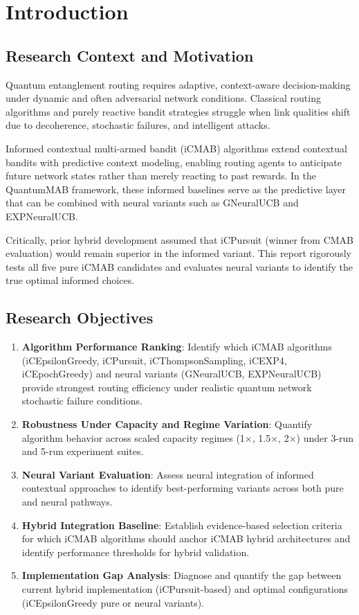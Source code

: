 \documentclass[12pt,a4paper]{article}
\begin{document}
\newpage
\section{Introduction}

\subsection{Research Context and Motivation}
Quantum entanglement routing requires adaptive, context-aware decision-making under dynamic and often adversarial network conditions. Classical routing algorithms and purely reactive bandit strategies struggle when link qualities shift due to decoherence, stochastic failures, and intelligent attacks.

Informed contextual multi-armed bandit (iCMAB) algorithms extend contextual bandits with predictive context modeling, enabling routing agents to anticipate future network states rather than merely reacting to past rewards. In the QuantumMAB framework, these informed baselines serve as the predictive layer that can be combined with neural variants such as GNeuralUCB and EXPNeuralUCB.

Critically, prior hybrid development assumed that iCPursuit (winner from CMAB evaluation) would remain superior in the informed variant. This report rigorously tests all five pure iCMAB candidates and evaluates neural variants to identify the true optimal informed choices.

\subsection{Research Objectives}
\begin{enumerate}
\item \textbf{Algorithm Performance Ranking}: Identify which iCMAB algorithms (iCEpsilonGreedy, iCPursuit, iCThompsonSampling, iCEXP4, iCEpochGreedy) and neural variants (GNeuralUCB, EXPNeuralUCB) provide strongest routing efficiency under realistic quantum network stochastic failure conditions.
\item \textbf{Robustness Under Capacity and Regime Variation}: Quantify algorithm behavior across scaled capacity regimes (1$\times$, 1.5$\times$, 2$\times$) under 3-run and 5-run experiment suites.
\item \textbf{Neural Variant Evaluation}: Assess neural integration of informed contextual approaches to identify best-performing variants across both pure and neural pathways.
\item \textbf{Hybrid Integration Baseline}: Establish evidence-based selection criteria for which iCMAB algorithms should anchor iCMAB hybrid architectures and identify performance thresholds for hybrid validation.
\item \textbf{Implementation Gap Analysis}: Diagnose and quantify the gap between current hybrid implementation (iCPursuit-based) and optimal configurations (iCEpsilonGreedy pure or neural variants).
\end{enumerate}
\end{document}
